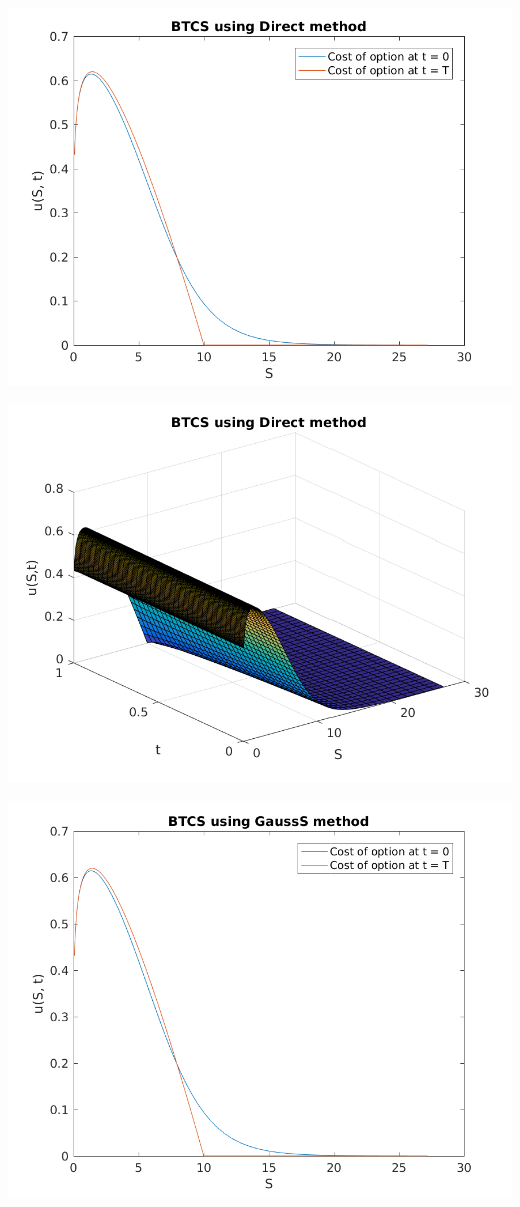 \documentclass{article}
\begin{document}
\includegraphics{"q2_3"}
\pagebreak


\includegraphics{"q2_4"}
\pagebreak


\includegraphics{"q2_5"}
\pagebreak
\end{document}
